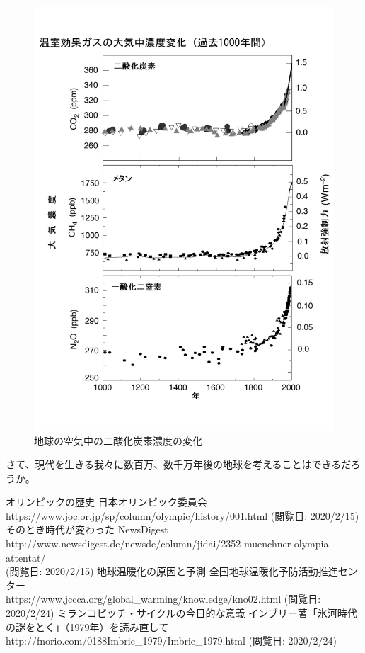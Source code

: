 \documentclass{jsarticle}
\begin{document}
\begin{figure}[ht]
    \centering
    \includegraphics[width=12cm]{graph.pdf}
    \caption{地球の空気中の二酸化炭素濃度の変化}
    \label{fig:graph}
\end{figure}

さて、現代を生きる我々に数百万、数千万年後の地球を考えることはできるだろうか。

\begin{thebibliography}{99}
     オリンピックの歴史 日本オリンピック委員会 \\
        https://www.joc.or.jp/sp/column/olympic/history/001.html
        (閲覧日: 2020/2/15)
     そのとき時代が変わった NewsDigest \\
        http://www.newsdigest.de/newsde/column/jidai/2352-muenchner-olympia-attentat/ \\
        (閲覧日: 2020/2/15)
     地球温暖化の原因と予測 全国地球温暖化予防活動推進センター \\
        https://www.jccca.org/global\_warming/knowledge/kno02.html
        (閲覧日: 2020/2/24)
     ミランコビッチ・サイクルの今日的な意義 インブリー著「氷河時代の謎をとく」（1979年）を読み直して \\
        http://fnorio.com/0188Imbrie\_1979/Imbrie\_1979.html
        (閲覧日: 2020/2/24)
\end{thebibliography}
\end{document}
